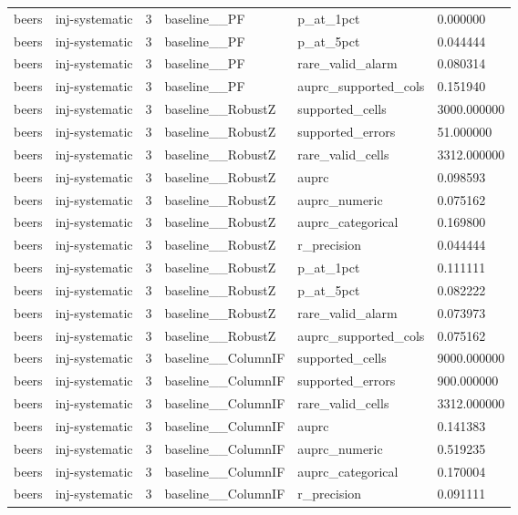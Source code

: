 \begin{tabular}{llllll}
beers & inj-systematic & 3 & baseline\_\_PF & p\_at\_1pct & 0.000000 \\
beers & inj-systematic & 3 & baseline\_\_PF & p\_at\_5pct & 0.044444 \\
beers & inj-systematic & 3 & baseline\_\_PF & rare\_valid\_alarm & 0.080314 \\
beers & inj-systematic & 3 & baseline\_\_PF & auprc\_supported\_cols & 0.151940 \\
beers & inj-systematic & 3 & baseline\_\_RobustZ & supported\_cells & 3000.000000 \\
beers & inj-systematic & 3 & baseline\_\_RobustZ & supported\_errors & 51.000000 \\
beers & inj-systematic & 3 & baseline\_\_RobustZ & rare\_valid\_cells & 3312.000000 \\
beers & inj-systematic & 3 & baseline\_\_RobustZ & auprc & 0.098593 \\
beers & inj-systematic & 3 & baseline\_\_RobustZ & auprc\_numeric & 0.075162 \\
beers & inj-systematic & 3 & baseline\_\_RobustZ & auprc\_categorical & 0.169800 \\
beers & inj-systematic & 3 & baseline\_\_RobustZ & r\_precision & 0.044444 \\
beers & inj-systematic & 3 & baseline\_\_RobustZ & p\_at\_1pct & 0.111111 \\
beers & inj-systematic & 3 & baseline\_\_RobustZ & p\_at\_5pct & 0.082222 \\
beers & inj-systematic & 3 & baseline\_\_RobustZ & rare\_valid\_alarm & 0.073973 \\
beers & inj-systematic & 3 & baseline\_\_RobustZ & auprc\_supported\_cols & 0.075162 \\
beers & inj-systematic & 3 & baseline\_\_ColumnIF & supported\_cells & 9000.000000 \\
beers & inj-systematic & 3 & baseline\_\_ColumnIF & supported\_errors & 900.000000 \\
beers & inj-systematic & 3 & baseline\_\_ColumnIF & rare\_valid\_cells & 3312.000000 \\
beers & inj-systematic & 3 & baseline\_\_ColumnIF & auprc & 0.141383 \\
beers & inj-systematic & 3 & baseline\_\_ColumnIF & auprc\_numeric & 0.519235 \\
beers & inj-systematic & 3 & baseline\_\_ColumnIF & auprc\_categorical & 0.170004 \\
beers & inj-systematic & 3 & baseline\_\_ColumnIF & r\_precision & 0.091111 \\

\end{tabular}
